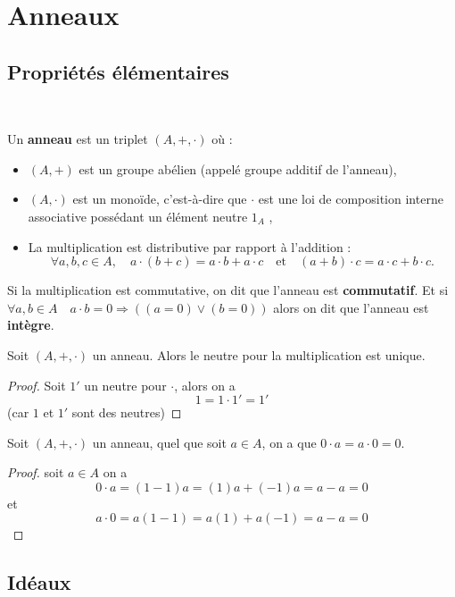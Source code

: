 \chapter{Anneaux}
\section{Propriétés élémentaires}

\
\begin{definition}
Un \textbf{anneau} est un triplet $(A, +, \cdot)$ où :  
\begin{itemize}
    \item $(A, +)$ est un groupe abélien (appelé groupe additif de l'anneau),
    \item $(A, \cdot)$ est un monoïde, c'est-à-dire que $\cdot$ est une loi de composition interne associative possédant un élément neutre $1_A$ ,
    \item La multiplication est distributive par rapport à l’addition :
    \[
        \forall a, b, c \in A, \quad a \cdot (b + c) = a \cdot b + a \cdot c \quad \text{et} \quad (a + b) \cdot c = a \cdot c + b \cdot c.
    \]
\end{itemize}

Si la multiplication est commutative, on dit que l'anneau est \textbf{commutatif}. Et si $\forall a,b \in A\quad a\cdot b=0 \Rightarrow ((a=0)\lor(b=0)) $ alors on dit que l'anneau est \textbf{intègre}.
\end{definition}

\begin{lemme}
    Soit $(A,+,\cdot)$ un anneau. Alors le neutre pour la multiplication est unique.
\end{lemme}

\begin{proof}
    Soit $1'$ un neutre pour $\cdot$, alors on a
    \[
    1=1\cdot 1'=1'
    \]
    (car $1$ et $1'$ sont des neutres)
\end{proof}

\begin{lemme}
    Soit $(A,+,\cdot)$ un anneau, quel que soit $a\in A$, on a que $0\cdot a=a\cdot0=0$.
\end{lemme}
\begin{proof}
   soit $a\in A$ on a
    \[
    0\cdot a=(1-1)a=(1)a+(-1)a=a-a=0
    \]
    et
    \[
    a\cdot0=a(1-1)=a(1)+a(-1)=a-a=0
    \]
\end{proof}
\section{Idéaux}

